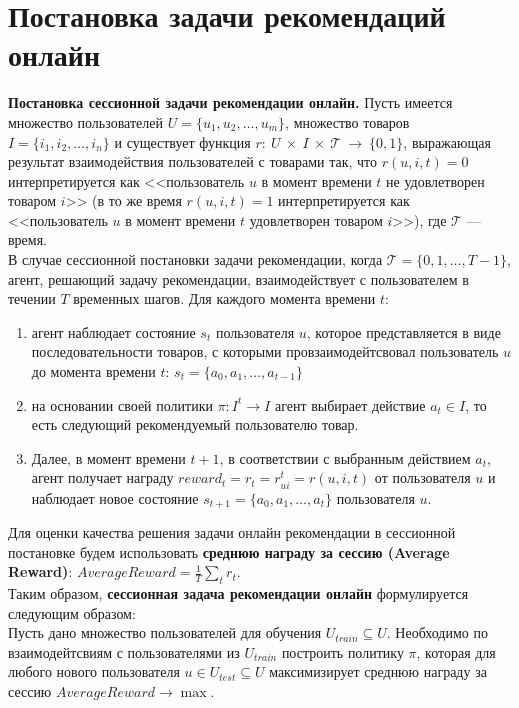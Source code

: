 \documentclass{mipt-thesis-ms}
\begin{document}
\section{Постановка задачи рекомендаций онлайн}
{\bf Постановка сессионной задачи рекомендации онлайн.} Пусть имеется множество пользователей $U = \{u_1, u_2, \dots, u_m\}$, множество товаров $I = \{i_1, i_2, \dots, i_n\}$ и существует функция $r:~U~\times~I~\times~\mathcal{T}~\rightarrow~\{0,  1\}$, выражающая результат взаимодействия пользователей с товарами так, что $r(u, i, t) = 0$ интерпретируется как <<пользователь $u$ в момент времени $t$ не удовлетворен товаром $i$>> (в то же время $r(u, i, t) = 1$ интерпретируется как <<пользователь $u$ в момент времени $t$ удовлетворен товаром $i$>>), где $\mathcal{T}$ --- время.\\
В случае сессионной постановки задачи рекомендации, когда $\mathcal{T} = \{0, 1, \dots, T - 1\}$, агент, решающий задачу рекомендации, взаимодействует с пользователем в течении $T$ временных шагов. Для каждого момента времени $t$: \\
\begin{enumerate}
\item агент наблюдает состояние $s_t$ пользователя $u$, которое представляется в виде последовательности товаров, с которыми провзаимодейтсвовал пользователь $u$ до момента времени $t$: $s_t = \{a_0, a_1, \dots, a_{t-1}\}$ \\
\item на основании своей политики $\pi: I^t \rightarrow I$ агент выбирает действие $a_t \in I$, то есть следующий рекомендуемый пользователю товар. 
\item Далее, в момент времени $t+1$, в соответствии с выбранным действием $a_t$, агент получает награду ${reward}_t = r_t = r^{t}_{ui} = r(u, i, t)$ от пользователя $u$ и наблюдает новое состояние $s_{t+1} = \{a_0, a_1, \dots, a_{t}\}$ пользователя $u$. 
\end{enumerate}

Для оценки качества решения задачи онлайн рекомендации в сессионной постановке будем использовать {\bf среднюю награду за сессию (Average Reward)}: $AverageReward = \frac1T \sum_t r_t$.\\

Таким образом, {\bf сессионная задача рекомендации онлайн} формулируется следующим образом:\\
Пусть дано множество пользователей для обучения $U_{train} \subseteq U$. Необходимо по взаимодейтсвиям с пользователями из $U_{train}$ построить политику $\pi$, которая для любого нового пользователя $u \in U_{test} \subseteq U$ максимизирует среднюю награду за сессию $AverageReward \rightarrow \max$.
\end{document}
